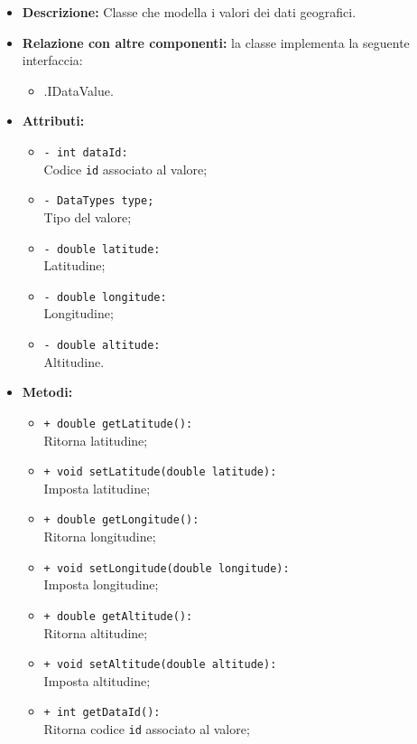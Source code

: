 \begin{flushleft}
\begin{itemize}
\item \textbf{Descrizione:} Classe che modella i valori dei dati geografici.
\item \textbf{Relazione con altre componenti:} la classe implementa la seguente interfaccia:
		\begin{itemize}
			\item \smodel{}.IDataValue.
		\end{itemize}
\item \textbf{Attributi:}
\begin{sloppypar}
\begin{itemize}
\item \texttt{- int dataId:}\\ Codice \texttt{id} associato al valore;
\item \texttt{- DataTypes type;}\\ Tipo del valore;
\item \texttt{- double latitude:}\\ Latitudine;
\item \texttt{- double longitude:}\\ Longitudine;
\item \texttt{- double altitude:}\\ Altitudine.
\end{itemize}
\end{sloppypar}
\item \textbf{Metodi:}
\begin{sloppypar}
\begin{itemize}
\item \texttt{+ double getLatitude():}\\ Ritorna latitudine;
\item \texttt{+ void setLatitude(double latitude):}\\ Imposta latitudine;
\item \texttt{+ double getLongitude():}\\ Ritorna longitudine;
\item \texttt{+ void setLongitude(double longitude):}\\ Imposta longitudine;
\item \texttt{+ double getAltitude():}\\ Ritorna altitudine;
\item \texttt{+ void setAltitude(double altitude):}\\ Imposta altitudine;
\item \texttt{+ int getDataId():}\\ Ritorna codice \texttt{id} associato al valore;

\end{itemize}
\end{sloppypar}
\end{itemize}
\end{flushleft}
